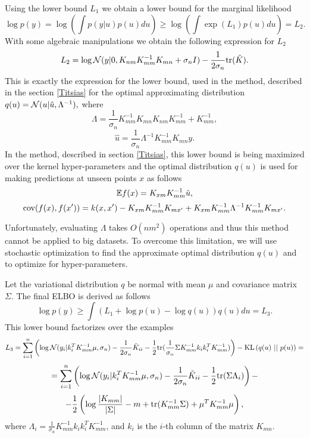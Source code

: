 \documentclass[12pt]{article}
\begin{document}
		Using the lower bound $L_1$ we obtain a lower bound for the marginal likelihood
		$$\log p(y) = \log \left( \int p(y|u) p(u) du\right) \ge \log \left( \int \exp(L_1) p(u) du\right) = L_2.$$
		With some algebraic manipulations we obtain the following expression for $L_2$
		$$L_2 = \log \mathcal{N}(y| 0, K_{nm} K_{mm}^{-1} K_{mn} + \sigma_n I) - \frac 1 {2 \sigma_n} \mbox{tr} (\tilde K).$$
		This is exactly the expression for the lower bound, used in the method, described in the section \ref{Titsias} for the optimal approximating distribution $q(u) = \mathcal{N}(u |\hat u, \Lambda^{-1}),$ where
		$$\Lambda = \frac 1 {\sigma_n} K_{mm}^{-1} K_{mn} K_{nm} K_{mm}^{-1} + K_{mm}^{-1},$$
		$$\hat u = \frac 1 {\sigma_n} \Lambda^{-1} K_{mm}^{-1} K_{mn} y.$$
		In the method, described in section \ref{Titsias}, this lower bound is being maximized over the kernel hyper-parameters and the optimal distribution $q(u)$ is used for making predictions at unseen points $x$ as follows
		$$\mathbb{E} f(x) = K_{xm} K_{mm}^{-1} \hat u, $$
		$$\mbox{cov}(f(x), f(x')) = k(x, x') - K_{xm} K_{mm}^{-1} K_{mx'} + K_{xm} K_{mm}^{-1} \Lambda^{-1} K_{mm}^{-1} K_{mx'}.$$
		
		Unfortunately, evaluating $\Lambda$ takes $O(n m^2)$ operations and thus this method cannot be applied to big datasets. To overcome this limitation, we will use stochastic optimization to find the approximate optimal distribution $q(u)$ and to optimize for hyper-parameters. 
		
		Let the variational distribution $q$ be normal with mean $\mu$ and covariance matrix $\Sigma$. The final ELBO is derived as follows
		$$\log p(y) \ge \int \left( L_1 + \log p(u) - \log q(u)\right) q(u) du = L_3.$$
		This lower bound factorizes over the examples 
		$$L_3 = \sum_{i = 1}^{n} \left( \log \mathcal{N}(y_i | k_i^T K_{mm}^{-1} \mu, \sigma_n) - \frac 1 {2 \sigma_n} \tilde K_{ii} - \frac 1 2 \mbox{tr} (\frac 1 {\sigma_n} \Sigma K_{mm}^{-1} k_i k_i^T K_{mm}^{-1}) \right) - \mbox{KL}\left(q(u)\mbox{ || }p(u)\right) = $$
		$$ = \sum_{i = 1}^{n} \left( \log \mathcal{N}(y_i | k_i^T K_{mm}^{-1} \mu, \sigma_n) - \frac 1 {2 \sigma_n} \tilde K_{ii} - \frac 1 2 \mbox{tr} (\Sigma \Lambda_i) \right) - $$
		$$ -\frac 1 2 \left (\log \frac {|K_{mm}|} {|\Sigma|} - m + \mbox{tr}(K_{mm}^{-1} \Sigma) + \mu^T K_{mm}^{-1} \mu \right),$$
		where $\Lambda_i = \frac 1 {\sigma_n} K_{mm}^{-1} k_i k_i^T K_{mm}^{-1}$, and $k_i$ is the $i$-th column of the matrix $K_{mn}$.
		
\end{document}
